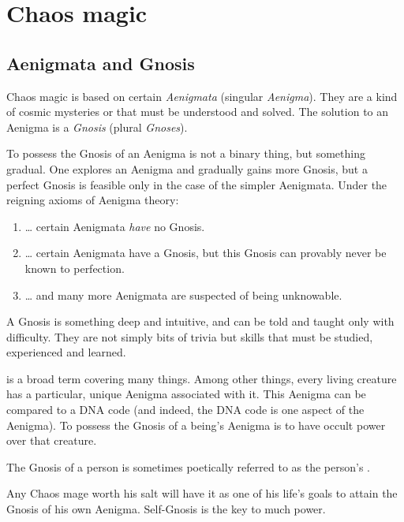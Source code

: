 \section{Chaos magic}




\subsection{Aenigmata and Gnosis}
Chaos magic is based on certain \emph{Aenigmata} (singular \emph{Aenigma}). 
They are a kind of cosmic mysteries or  that must be understood and solved. 
The solution to an Aenigma is a \emph{Gnosis} (plural \emph{Gnoses}). 

To possess the Gnosis of an Aenigma is not a binary thing, but something gradual. 
One explores an Aenigma and gradually gains more Gnosis, but a perfect Gnosis is feasible only in the case of the simpler Aenigmata. 
Under the reigning axioms of Aenigma theory: 
\begin{enumerate}
  \item \ldots{} certain Aenigmata \emph{have} no Gnosis. 
  \item \ldots{} certain Aenigmata have a Gnosis, but this Gnosis can provably never be known to perfection. 
  \item \ldots{} and many more Aenigmata are suspected of being unknowable. 
\end{enumerate}

A Gnosis is something deep and intuitive, and can be told and taught only with difficulty. 
They are not simply bits of trivia but skills that must be studied, experienced and learned. 

 is a broad term covering many things. 
Among other things, every living creature has a particular, unique Aenigma associated with it. 
This Aenigma can be compared to a DNA code (and indeed, the DNA code is one aspect of the Aenigma). 
To possess the Gnosis of a being's Aenigma is to have occult power over that creature. 

The Gnosis of a person is sometimes poetically referred to as the person's . 

Any Chaos mage worth his salt will have it as one of his life's goals to attain the Gnosis of his own Aenigma. 
Self-Gnosis is the key to much power. 

